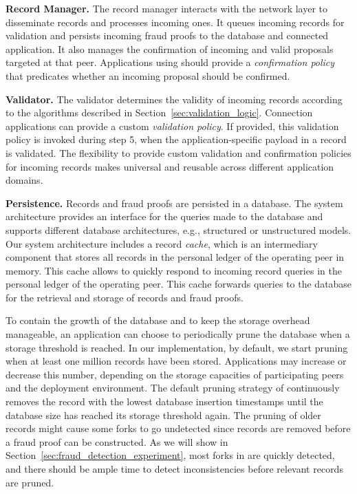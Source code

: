 \textbf{Record Manager.}
The record manager interacts with the network layer to disseminate records and processes incoming ones.
It queues incoming records for validation and persists incoming fraud proofs to the database and connected application.
It also manages the confirmation of incoming and valid proposals targeted at that peer.
Applications using \TrustChain{} should provide a \emph{confirmation policy} that predicates whether an incoming proposal should be confirmed.

\textbf{Validator.}
The validator determines the validity of incoming records according to the algorithms described in Section~\ref{sec:validation_logic}.
Connection applications can provide a custom \emph{validation policy}.
If provided, this validation policy is invoked during step 5, when the application-specific payload in a record is validated.
The flexibility to provide custom validation and confirmation policies for incoming records makes \TrustChain{} universal and reusable across different application domains.

\textbf{Persistence.}
Records and fraud proofs are persisted in a database.
The \TrustChain{} system architecture provides an interface for the queries made to the database and supports different database architectures, e.g., structured or unstructured models.
Our system architecture includes a record \emph{cache}, which is an intermediary component that stores all records in the personal ledger of the operating peer in memory.
This cache allows \TrustChain{} to quickly respond to incoming record queries in the personal ledger of the operating peer.
This cache forwards queries to the database for the retrieval and storage of records and fraud proofs.

To contain the growth of the database and to keep the storage overhead manageable, an application can choose to periodically prune the \TrustChain{} database when a storage threshold is reached.
In our implementation, by default, we start pruning when at least one million records have been stored.
Applications may increase or decrease this number, depending on the storage capacities of participating peers and the deployment environment.
The default pruning strategy of \TrustChain{} continuously removes the record with the lowest database insertion timestamps until the database size has reached its storage threshold again.
The pruning of older records might cause some forks to go undetected since records are removed before a fraud proof can be constructed.
As we will show in Section~\ref{sec:fraud_detection_experiment}, most forks in \TrustChain{} are quickly detected, and there should be ample time to detect inconsistencies before relevant records are pruned.

